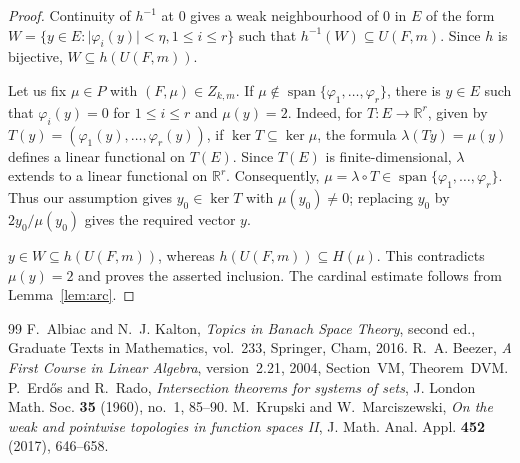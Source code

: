 \documentclass[10pt,a4paper]{amsart}
\newcommand{\R}{\mathbb{R}}
\newcommand{\abs}[1]{\lvert #1\rvert}
\begin{document}
\begin{proof}
Continuity of $h^{-1}$ at $0$ gives a weak neighbourhood of $0$ in $E$
of the form $W=\{y\in E:\abs{\varphi_i(y)}<\eta,
1\leqslant i\leqslant r\}$ such that
$h^{-1}(W)\subseteq U(F,m)$.  Since $h$ is bijective,
$W\subseteq h(U(F,m))$.

Let us fix $\mu\in P$ with $(F,\mu)\in Z_{k,m}$.  If
$\mu\notin\operatorname{span}\{\varphi_1,\ldots,\varphi_r\}$, there is
$y\in E$ such that
$\varphi_i(y)=0$ for $1\leqslant i\leqslant r$ and $\mu(y)=2$.
Indeed, for $T\colon E\to\R^r$, given by
$T(y)=(\varphi_1(y),\ldots,\varphi_r(y))$, if
$\ker T\subseteq\ker\mu$, the formula $\lambda(Ty)=\mu(y)$ defines a
linear functional on $T(E)$.  Since $T(E)$ is finite-dimensional,
$\lambda$ extends to a linear functional on $\R^r$.  Consequently,
$\mu=\lambda\circ T\in\operatorname{span}\{\varphi_1,\ldots,\varphi_r\}$.
Thus our assumption gives $y_0\in\ker T$ with $\mu(y_0)\ne0$; replacing
$y_0$ by $2y_0/\mu(y_0)$ gives the required vector $y$.

$y\in W\subseteq h(U(F,m))$, whereas
$h(U(F,m))\subseteq H(\mu)$.  This contradicts $\mu(y)=2$ and proves
the asserted inclusion.  The cardinal estimate follows from
Lemma~\ref{lem:arc}.
\end{proof}


\begin{thebibliography}{99}
 F.~Albiac and N.~J. Kalton, \emph{Topics in Banach Space Theory}, second ed., Graduate Texts in Mathematics, vol.~233, Springer, Cham, 2016.
 R.~A. Beezer, \emph{A First Course in Linear Algebra}, version~2.21, 2004, Section~VM, Theorem~DVM.
 P.~Erd\H{o}s and R.~Rado, \emph{Intersection theorems for systems of sets}, J. London Math. Soc. \textbf{35} (1960), no.~1, 85--90.
 M.~Krupski and W.~Marciszewski, \emph{On the weak and pointwise topologies in function spaces II}, J. Math. Anal. Appl. \textbf{452} (2017), 646--658.
\end{thebibliography}
\end{document}

